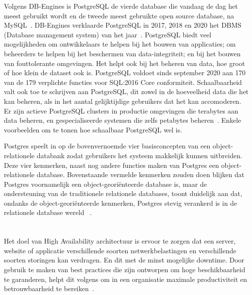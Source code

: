Volgens DB-Engines is PostgreSQL de vierde database die vandaag de dag het meest gebruikt wordt en de tweede meest gebruikte open source database, na MySQL~\autocite{DBEngines2021}. DB-Engines verklaarde PostgreSQL in 2017, 2018 en 2020 het DBMS (Database management system) van het jaar~\autocite{DBEngines2021a}.
PostgreSQL biedt veel mogelijkheden om ontwikkelaars te helpen bij het bouwen van applicaties; om beheerders te helpen bij het beschermen van data-integriteit; en bij het bouwen van fouttolerante omgevingen. Het helpt ook bij het beheren van data, hoe groot of hoe klein de dataset ook is. PostgreSQL voldoet sinds september 2020 aan 170 van de 179 verplichte functies voor SQL:2016 Core conformiteit. Schaalbaarheid valt ook toe te schrijven aan PostgreSQL, dit zowel in de hoeveelheid data die het kan beheren, als in het aantal gelijktijdige gebruikers dat het kan accomoderen. Er zijn actieve PostgreSQL clusters in productie omgevingen die terabytes aan data beheren, en gespecialiseerde systemen die zelfs petabytes beheren~\autocite{PostgreSQL2021}. Enkele voorbeelden om te tonen hoe schaalbaar PostgreSQL wel is.

Postgres speelt in op de bovenvernoemde vier basisconcepten van een object-relationele databank zodat gebruikers het systeem makkelijk kunnen uitbreiden. Deze vier kenmerken, naast nog andere functies maken van Postgres een object-relationele database. Bovenstaande vermelde kenmerken zouden doen blijken dat Postgres voornamelijk een object-georiënteerde database is, maar de ondersteuning van de traditionele relationele databases, toont duidelijk aan dat, ondanks de object-georiënteerde kenmerken, Postgres stevig verankerd is in de relationele database wereld ~\autocite{PostgreSQL2021a}.




\section{}
\label{sec:High Availability}

Het doel van High Availability architectuur is ervoor te zorgen dat een server, website of applicatie verschillende soorten netwerkbelastingen en verschillende soorten storingen kan verdragen. En dit met de minst mogelijke downtime. Door gebruik te maken van best practices die zijn ontworpen om hoge beschikbaarheid te garanderen, helpt dit volgens \textcite{2017} om in een organisatie maximale productiviteit en betrouwbaarheid te bereiken~\autocite{2017}.


